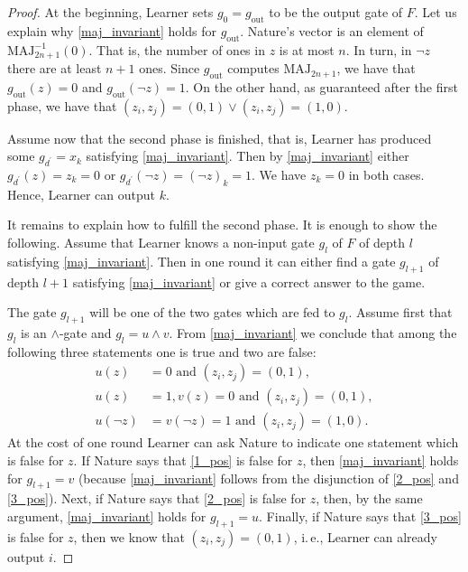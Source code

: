 \documentclass[11pt]{article}
\numberwithin{equation}{section}
\theoremstyle{definition}
\theoremstyle{plain}
\newcommand{\ie}{i.\,e.}
\def\MAJ{\mathrm{MAJ}}
\begin{document}
\begin{proof}
At the beginning, Learner sets $g_0 = g_{\mathrm{out}}$ to be the output gate of $F$. Let us explain why \eqref{maj_invariant} holds for $g_{\mathrm{out}}$. Nature's vector is an element of $\MAJ_{2n + 1}^{-1}(0)$. That is, the number of ones in $z$ is at most $n$. In turn, in $\lnot z$ there are at least  $n + 1$ ones. Since  $g_{\mathrm{out}}$ computes $\MAJ_{2n + 1}$, we have that  $g_{\mathrm{out}}(z) = 0$ and $g_{\mathrm{out}}(\lnot z) = 1$. On the other hand, as %
guaranteed  %
after the first phase, we have that $(z_i, z_j) = (0,1) \lor (z_i,z_j) = (1,0)$.

Assume now that the second phase is finished, that is, Learner has produced some $g_{d^\prime} = x_k$ satisfying \eqref{maj_invariant}. Then by \eqref{maj_invariant} either $g_{d^\prime}(z) = z_k = 0$ or $g_{d^\prime}(\lnot z) = (\lnot z)_k = 1$. We have $z_k = 0$ in both cases. Hence, Learner can output $k$.

It remains to explain how to fulfill the second phase. It is enough to show the following. Assume that Learner knows a non-input gate $g_l$ of $F$ of depth $l$  satisfying \eqref{maj_invariant}. Then in one round it 
%
 can  either find a gate $g_{l + 1}$ of depth $l + 1$ satisfying \eqref{maj_invariant} or give a correct answer to the game.


The gate $g_{l + 1}$ will be one of the two gates which are fed to $g_l$.  Assume first that $g_l$ is an $\land$-gate and $g_l = u \land v$.
  From \eqref{maj_invariant} we conclude that among the following three statements one is true and two are false:
\begin{align}
\label{1_pos}
u(z) &= 0 \mbox{ and } (z_i, z_j) = (0,1), \\
\label{2_pos}
u(z) &= 1, v(z) = 0 \mbox{ and } (z_i, z_j) = (0,1),\\
\label{3_pos}
u(\lnot z) &= v(\lnot z) = 1 \mbox{ and } (z_i,z_j) = (1,0).
\end{align}
At the cost of one round Learner can ask Nature to indicate one 
statement which is false for $z$. %
If Nature says that \eqref{1_pos}
is false for $z$, %
then   \eqref{maj_invariant} holds for $g_{l + 1} = v$ (because \eqref{maj_invariant} follows from the disjunction of \eqref{2_pos} and \eqref{3_pos}). Next, if Nature says that \eqref{2_pos} is false for $z$, then, by the same argument, \eqref{maj_invariant} holds for $g_{l + 1} = u$. Finally, if Nature says that \eqref{3_pos} is false for $z$, then we know that $(z_i, z_j) = (0,1)$, \ie, Learner  can already output $i$.


\end{proof}
\end{document}
